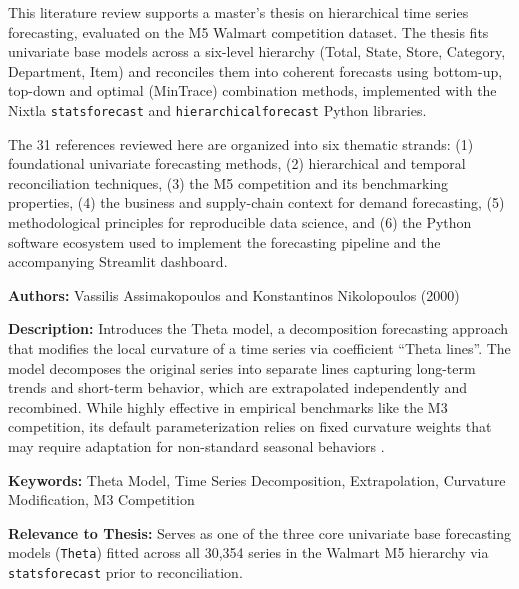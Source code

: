 %
%
%


%


\STANDARD{}
{

	This literature review supports a master's thesis on hierarchical time series forecasting, evaluated on the M5 Walmart competition dataset. The thesis fits univariate base models across a six-level hierarchy (Total, State, Store, Category, Department, Item) and reconciles them into coherent forecasts using bottom-up, top-down and optimal (MinTrace) combination methods, implemented with the Nixtla \texttt{statsforecast} and \texttt{hierarchicalforecast} Python libraries.

	The 31 references reviewed here are organized into six thematic strands: (1) foundational univariate forecasting methods, (2) hierarchical and temporal reconciliation techniques, (3) the M5 competition and its benchmarking properties, (4) the business and supply-chain context for demand forecasting, (5) methodological principles for reproducible data science, and (6) the Python software ecosystem used to implement the forecasting pipeline and the accompanying Streamlit dashboard.

}


{

	\textbf{Authors:}
	Vassilis Assimakopoulos and Konstantinos Nikolopoulos (2000)

	\textbf{Description:}
	Introduces the Theta model, a decomposition forecasting approach that modifies the local curvature of a time series via coefficient ``Theta lines''. The model decomposes the original series into separate lines capturing long-term trends and short-term behavior, which are extrapolated independently and recombined. While highly effective in empirical benchmarks like the M3 competition, its default parameterization relies on fixed curvature weights that may require adaptation for non-standard seasonal behaviors \autocite{Assimakopoulos:2000}.

	\textbf{Keywords:}
	Theta Model, Time Series Decomposition, Extrapolation, Curvature Modification, M3 Competition

	\textbf{Relevance to Thesis:}
	Serves as one of the three core univariate base forecasting models (\texttt{Theta}) fitted across all 30,354 series in the Walmart M5 hierarchy via \texttt{statsforecast} prior to reconciliation.

}

